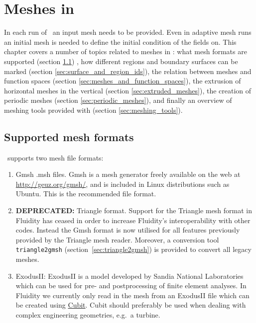 \chapter{Meshes in \fluidity}\label{chap:meshes}

In each run of \fluidity\ an input mesh needs to
be provided. Even in adaptive mesh runs an initial mesh is needed
to define the initial condition of the fields on.
This chapter covers a number of topics
related to meshes in \fluidity:  what
mesh formats are supported (section \ref{sec:supported_mesh_formats})
, how different regions and boundary surfaces can be
marked (section \ref{sec:surface_and_region_ids}),
the relation between meshes and function spaces (section
\ref{sec:meshes_and_function_spaces}), the extrusion of
horizontal meshes in the vertical (section \ref{sec:extruded_meshes}),
the creation of periodic meshes (section \ref{sec:periodic_meshes}),
and finally an overview of meshing tools provided with \fluidity (section
\ref{sec:meshing_tools}).

\section{Supported mesh formats}
\label{sec:supported_mesh_formats}
\fluidity\ supports two mesh file formats:
\begin{enumerate}
\item Gmsh .msh files. Gmsh is a mesh generator freely available on the
web at \url{http://geuz.org/gmsh/}, and is included in Linux distributions
such as Ubuntu. This is the recommended file format.
\item {\bf DEPRECATED:} Triangle format. Support for the Triangle mesh
  format in Fluidity has ceased in order to increase Fluidity's
  interoperability with other codes. Instead the Gmsh format is now
  utilised for all features previously provided by the Triangle mesh
  reader. Moreover, a conversion tool \lstinline+triangle2gmsh+
  (section~\ref{sec:triangle2gmsh}) is provided to convert all legacy
  meshes.
\item ExodusII: ExodusII is a model developed by Sandia National Laboratories
which can be used for pre- and postprocessing of finite element analyses.
In Fluidity we currently only read in the mesh from an ExodusII file which
can be created using \href{http://cubit.sandia.gov/}{Cubit}. Cubit should
preferably be used when dealing with complex engineering geometries, e.g.~a
turbine.
\end{enumerate}

